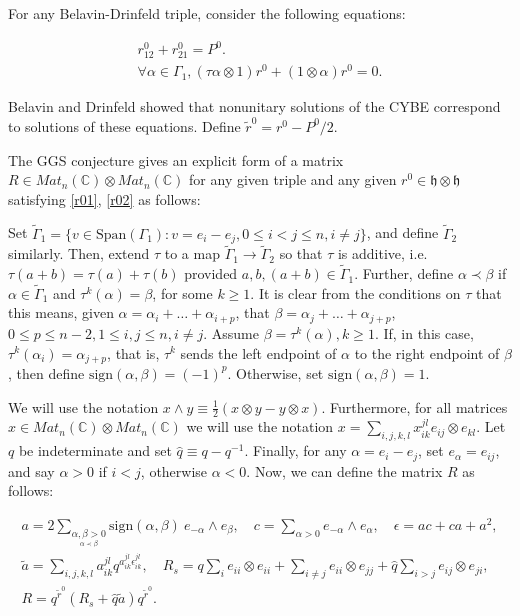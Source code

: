 \documentclass[12pt]{article}
\numberwithin{equation}{section}
\begin{document}
For any Belavin-Drinfeld triple, consider the following equations:

\begin{gather} \label{r01}
r^0_{12} + r^0_{21} = P^0. \\ \label{r02} \forall \alpha \in \Gamma_1,
(\tau \alpha \otimes 1)r^0 + (1 \otimes \alpha) r^{0} = 0.
\end{gather}

Belavin and Drinfeld showed that nonunitary solutions of the CYBE
correspond to solutions of these equations.  Define $\tilde r^0 =
r^0-P^0/2$.

The GGS conjecture gives an explicit form of a matrix $R \in
Mat_n(\mathbb C) \otimes Mat_n(\mathbb C)$ for any given triple and
any given $r^0 \in \mathfrak h \otimes \mathfrak h$ satisfying
\eqref{r01}, \eqref{r02} as follows:

Set $\tilde \Gamma_1 = \{v \in \text{Span}(\Gamma_1): v = e_i - e_j, 0
\leq i < j \leq n, i \neq j\}$, and define $\tilde \Gamma_2$ similarly.
Then, extend $\tau$ to a map $\tilde \Gamma_1 \rightarrow \tilde
\Gamma_2$ so that $\tau$ is additive, i.e. $\tau(a+b) = \tau(a) +
\tau(b)$ provided $a,b,(a+b) \in \tilde \Gamma_1$.  Further, define
$\alpha \prec \beta$ if $\alpha \in \tilde \Gamma_1$ and
$\tau^k(\alpha) = \beta$, for some $k \geq 1$.  It is clear from the
conditions on $\tau$ that this means, given $\alpha = \alpha_i +
\ldots + \alpha_{i+p}$, that $\beta = \alpha_j + \ldots +
\alpha_{j+p}$, $0 \leq p \leq n-2, 1 \leq i,j \leq n, i \neq j$.
Assume $\beta = \tau^k(\alpha), k \geq 1$.  If, in this case,
$\tau^k(\alpha_i) = \alpha_{j+p}$, that is, $\tau^k$ sends the left
endpoint of $\alpha$ to the right endpoint of $\beta$, then define
$\text{sign}(\alpha,\beta) = (-1)^p$.  Otherwise, set
$\text{sign}(\alpha,\beta) = 1$.

We will use the notation $x \wedge y \equiv \frac{1}{2} (x \otimes y - y
\otimes x)$.  Furthermore, for all matrices $x \in Mat_n(\mathbb C)
\otimes Mat_n(\mathbb C)$ we will use the notation $x = \sum_{i,j,k,l}
x_{ik}^{jl} e_{ij} \otimes e_{kl}$.  Let $q$ be indeterminate and set
$\hat q \equiv q-q^{-1}$.  Finally, for any $\alpha = e_i - e_j$, set
$e_{\alpha} = e_{ij}$, and say $\alpha > 0$ if $i < j$, otherwise
$\alpha < 0$.  Now, we can define the matrix $R$ as follows:

\begin{gather} \label{ace}
a = 2 \sum_{\underset{\alpha \prec \beta}{\alpha, \beta > 0}}
\text{sign}(\alpha,\beta)\: e_{-\alpha} \wedge e_{\beta}, \quad c =
\sum_{\alpha > 0} e_{-\alpha} \wedge e_\alpha, \quad \epsilon = ac +
ca + a^2, \\ \label{tars}
\tilde a = \sum_{i,j,k,l} a_{ik}^{jl} q^{a_{ik}^{jl}
\epsilon_{ik}^{jl}}, \quad R_s = q \sum_{i} e_{ii} \otimes e_{ii} +
\sum_{i \neq j} e_{ii} \otimes e_{jj} + \hat q \sum_{i>j} e_{ij}
\otimes e_{ji}, \\ \label{r} R = q^{\tilde r^0} (R_s + \hat q \tilde a)
q^{\tilde r^0}.
\end{gather}
\end{document}
